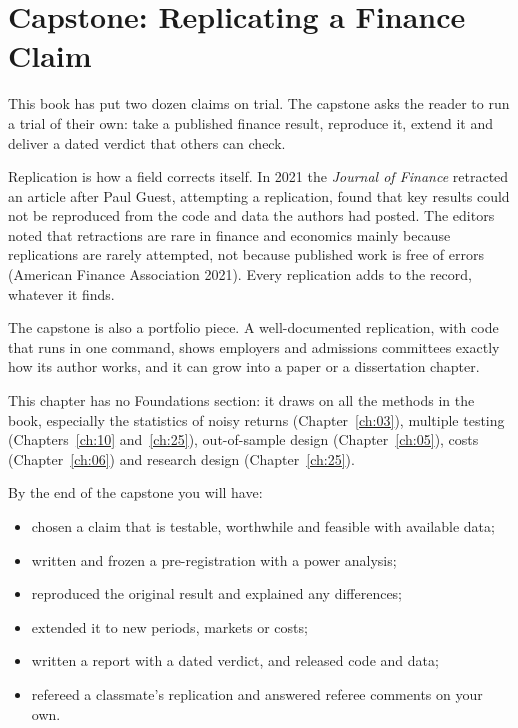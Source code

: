 \makeatletter
{}
\makeatother

\chapter{Capstone: Replicating a Finance Claim}
\label{ch:26}

This book has put two dozen claims on trial. The capstone asks the reader to run a trial of their own: take a published finance result, reproduce it, extend it and deliver a dated verdict that others can check.

Replication is how a field corrects itself. In 2021 the \emph{Journal of Finance} retracted an article after Paul Guest, attempting a replication, found that key results could not be reproduced from the code and data the authors had posted. The editors noted that retractions are rare in finance and economics mainly because replications are rarely attempted, not because published work is free of errors (American Finance Association 2021). Every replication adds to the record, whatever it finds.

The capstone is also a portfolio piece. A well-documented replication, with code that runs in one command, shows employers and admissions committees exactly how its author works, and it can grow into a paper or a dissertation chapter.

This chapter has no Foundations section: it draws on all the methods in the book, especially the statistics of noisy returns (Chapter~\ref{ch:03}), multiple testing (Chapters~\ref{ch:10} and~\ref{ch:25}), out-of-sample design (Chapter~\ref{ch:05}), costs (Chapter~\ref{ch:06}) and research design (Chapter~\ref{ch:25}).

By the end of the capstone you will have:

\begin{itemize}
  \item chosen a claim that is testable, worthwhile and feasible with available data;
  \item written and frozen a pre-registration with a power analysis;
  \item reproduced the original result and explained any differences;
  \item extended it to new periods, markets or costs;
  \item written a report with a dated verdict, and released code and data;
  \item refereed a classmate's replication and answered referee comments on your own.
\end{itemize}

